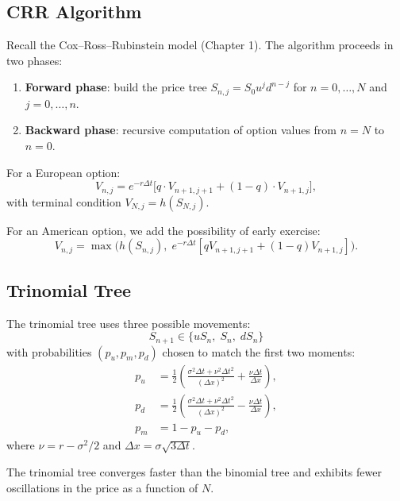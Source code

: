 \subsection{CRR Algorithm}

Recall the Cox--Ross--Rubinstein model (Chapter 1). The algorithm proceeds
in two phases:
\begin{enumerate}
    \item \textbf{Forward phase}: build the price tree
          $S_{n,j} = S_0 u^j d^{n-j}$ for $n = 0, \ldots, N$ and
          $j = 0, \ldots, n$.
    \item \textbf{Backward phase}: recursive computation of option values
          from $n = N$ to $n = 0$.
\end{enumerate}

\begin{keyformulas}[title=\textbf{Backward Recursion}]
For a European option:
\[
    V_{n,j} = e^{-r\Delta t}\bigl[q \cdot V_{n+1,j+1}
              + (1-q) \cdot V_{n+1,j}\bigr],
\]
with terminal condition $V_{N,j} = h(S_{N,j})$.

For an American option, we add the possibility of early exercise:
\[
    V_{n,j} = \max\!\bigl(h(S_{n,j}),\;
              e^{-r\Delta t}[q V_{n+1,j+1} + (1-q) V_{n+1,j}]\bigr).
\]
\end{keyformulas}

\subsection{Trinomial Tree}

\begin{definition}
The trinomial tree uses three possible movements:
\[
    S_{n+1} \in \{u S_n,\; S_n,\; d S_n\}
\]
with probabilities $(p_u, p_m, p_d)$ chosen to match the first two moments:
\begin{align}
    p_u &= \frac{1}{2}\left(\frac{\sigma^2\Delta t + \nu^2\Delta t^2}
           {(\Delta x)^2} + \frac{\nu\Delta t}{\Delta x}\right), \\
    p_d &= \frac{1}{2}\left(\frac{\sigma^2\Delta t + \nu^2\Delta t^2}
           {(\Delta x)^2} - \frac{\nu\Delta t}{\Delta x}\right), \\
    p_m &= 1 - p_u - p_d,
\end{align}
where $\nu = r - \sigma^2/2$ and $\Delta x = \sigma\sqrt{3\Delta t}$.
\end{definition}

\begin{remark}
The trinomial tree converges faster than the binomial tree and exhibits
fewer oscillations in the price as a function of $N$.
\end{remark}

